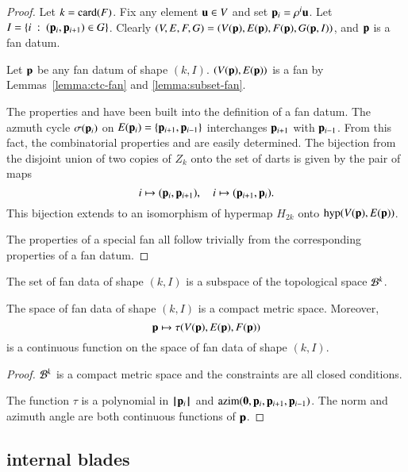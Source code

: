 \begin{proof}
Let $k={\operatorname{card}}(F)$.  Fix any element ${\mathbf u}\in V$ and set ${\mathbf p}_i = \rho^i {\mathbf u}$.
Let $I = \{i\ :\  ({\mathbf p}_i,{\mathbf p}_{i+1}) \in G\}$.  Clearly $(V,E,F,G)=(V({\mathbf p}),E({\mathbf p}),F({\mathbf p}),G({\mathbf p},I))$, and
${\mathbf p}$ is a fan datum.

Let ${\mathbf p}$ be any fan datum of shape $(k,I)$.
$(V({\mathbf p}),E({\mathbf p}))$
is a fan by Lemmas~\ref{lemma:ctc-fan} and \ref{lemma:subset-fan}.


 The properties  and  have been built into the definition of a fan datum.  The azmuth cycle $\sigma({\mathbf p}_i)$ on $E({\mathbf p}_i) = \{{\mathbf p}_{i+1},{\mathbf p}_{i-1}\}$ interchanges ${\mathbf p}_{i+1}$ with ${\mathbf p}_{i-1}$.  From this fact, the combinatorial properties  and  are easily determined.  The bijection from the disjoint union of two copies of $Z_k$ onto the set of darts is given by the pair of maps
$$
i\mapsto ({\mathbf p}_i,{\mathbf p}_{i+1}),\quad i\mapsto ({\mathbf p}_{i+1},{\mathbf p}_i).
$$
This bijection extends to an isomorphism of hypermap $H_{2k}$ onto
${\operatorname{hyp}}(V({\mathbf p}),E({\mathbf p}))$.

 The properties of a special fan all follow trivially from the corresponding properties of a fan datum.
\end{proof}

The set of fan data of shape $(k,I)$ is a subspace of the topological space  ${\mathcal B}^k$.


\begin{lemma}
The space of fan data of shape $(k,I)$ is a compact metric space.  Moreover,
$$
{\mathbf p} \mapsto \tau(V({\mathbf p}),E({\mathbf p}),F({\mathbf p}))
$$
is a continuous function on the space of fan data of shape $(k,I)$.
\end{lemma}

\begin{proof}  ${\mathcal B}^k$ is a compact metric space and the constraints are all closed conditions.

The function $\tau$ is a polynomial in ${{\hskip0.1em|\hskip-0.15em|\hskip0.1em}{\mathbf p}_i{\hskip0.1em|\hskip-0.15em|\hskip0.1em}}$ and ${\operatorname{azim}}({\mathbf 0},{\mathbf p}_i,{\mathbf p}_{i+1},{\mathbf p}_{i-1})$.  The norm and azimuth angle are both continuous functions of ${\mathbf p}$.  
\end{proof}




\subsection{internal blades}


